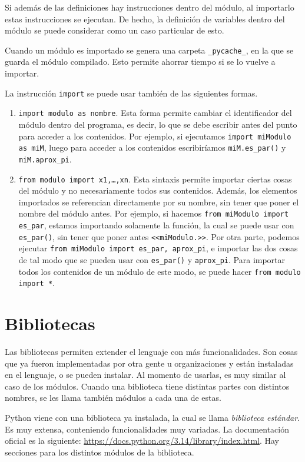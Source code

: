 \documentclass[a4paper, 12pt]{report}
\theoremstyle{definition}
\begin{document}
Si además de las definiciones hay instrucciones dentro del módulo, al importarlo estas instrucciones se ejecutan. De hecho, la definición de variables dentro del módulo se puede considerar como un caso particular de esto.

Cuando un módulo es importado se genera una carpeta {\tt \_pycache\_}, en la que se guarda el módulo compilado. Esto permite ahorrar tiempo si se lo vuelve a importar.

La instrucción {\tt import} se puede usar también de las siguientes formas.
\begin{enumerate}
	\item {\tt import modulo as nombre}. Esta forma permite cambiar el identificador del módulo dentro del programa, es decir, lo que se debe escribir antes del punto para acceder a los contenidos. Por ejemplo, si ejecutamos {\tt import miModulo as miM}, luego para acceder a los contenidos escribiríamos {\tt miM.es\_par()} y {\tt miM.aprox\_pi}.
	\item {\tt from modulo import x1,\dots,xn}. Esta sintaxis permite importar ciertas cosas del módulo y no necesariamente todos sus contenidos. Además, los elementos importados se referencian directamente por su nombre, sin tener que poner el nombre del módulo antes. Por ejemplo, si hacemos {\tt from miModulo import es\_par}, estamos importando solamente la función, la cual se puede usar con {\tt es\_par()}, sin tener que poner antes {\tt <<miModulo.>>}. Por otra parte, podemos ejecutar {\tt from miModulo import es\_par, aprox\_pi}, e importar las dos cosas de tal modo que se pueden usar con {\tt es\_par()} y {\tt aprox\_pi}. Para importar todos los contenidos de un módulo de este modo, se puede hacer {\tt from modulo import *}.
\end{enumerate}


\section{Bibliotecas}


Las bibliotecas permiten extender el lenguaje con más funcionalidades. Son cosas que ya fueron implementadas por otra gente u organizaciones y están instaladas en el lenguaje, o se pueden instalar. Al momento de usarlas, es muy similar al caso de los módulos. Cuando una biblioteca tiene distintas partes con distintos nombres, se les llama también módulos a cada una de estas.

Python viene con una biblioteca ya instalada, la cual se llama {\sl biblioteca estándar}. Es muy extensa, conteniendo funcionalidades muy variadas. La documentación oficial es la siguiente: \href{https://docs.python.org/3.14/library/index.html}{https://docs.python.org/3.14/library/index.html}. Hay secciones para los distintos módulos de la biblioteca.
\end{document}

